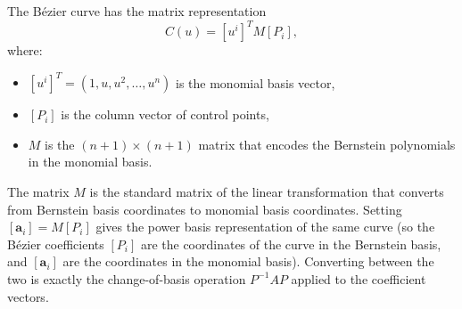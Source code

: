 \begin{remark*}
The B\'{e}zier curve has the matrix representation
\[
  C(u) = [u^i]^T M [P_i],
\]
where:
\begin{itemize}
  \item $[u^i]^T = (1, u, u^2, \ldots, u^n)$ is the monomial basis vector,
  \item $[P_i]$ is the column vector of control points,
  \item $M$ is the $(n+1)\times(n+1)$ matrix that encodes the Bernstein polynomials
        in the monomial basis.
\end{itemize}
The matrix $M$ is the standard matrix of the linear transformation
that converts from Bernstein basis coordinates to monomial basis coordinates.
Setting $[\mathbf{a}_i] = M[P_i]$ gives the power basis representation of the
same curve (so the B\'{e}zier coefficients $[P_i]$ are the coordinates of the
curve in the Bernstein basis, and $[\mathbf{a}_i]$ are the coordinates in the
monomial basis).
Converting between the two is exactly the change-of-basis operation $P^{-1}AP$
applied to the coefficient vectors.
\end{remark*}
